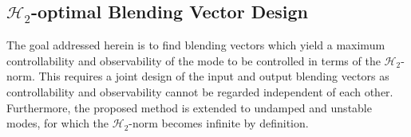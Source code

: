 \documentclass[aerospace,article,submit,moreauthors,pdftex,10pt,a4paper]{Definitions/mdpi}
\begin{document}
%
% 
\subsection{$\mathcal{H}_2$-optimal Blending Vector Design}
\label{sec:contrObs}


The goal addressed herein is to find blending vectors which yield a maximum controllability and observability of the mode to be controlled in terms of the $\mathcal{H}_2$-norm.
This requires a joint design of the input and output blending vectors as controllability and observability cannot be regarded independent of each other.
Furthermore, the proposed method is extended to undamped and unstable modes, for which the $\mathcal{H}_2$-norm becomes infinite by definition.
\end{document}
